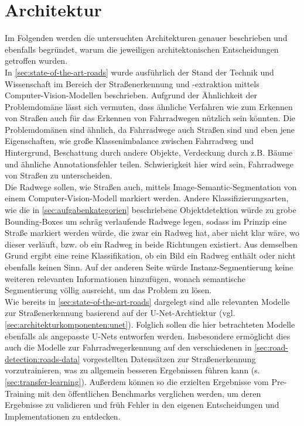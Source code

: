 \section{Architektur} \label{sec:architecture}

Im Folgenden werden die untersuchten Architekturen genauer beschrieben und ebenfalls begründet, 
warum die jeweiligen architektonischen Entscheidungen getroffen wurden. \\
In \autoref{sec:state-of-the-art-roads} wurde ausführlich der Stand der Technik und Wissenschaft 
im Bereich der Straßenerkennung und -extraktion mittels Computer-Vision-Modellen beschrieben. 
Aufgrund der Ähnlichkeit der Problemdomäne lässt sich vermuten, dass ähnliche Verfahren wie 
zum Erkennen von Straßen auch für das Erkennen von Fahrradwegen nützlich sein könnten. 
Die Problemdomänen sind ähnlich, da Fahrradwege auch Straßen sind und eben jene Eigenschaften, 
wie große Klassenimbalance zwischen Fahrradweg und Hintergrund, Beschattung durch andere Objekte,
Verdeckung durch z.B. Bäume und ähnliche Annotationsfehler   
teilen. Schwierigkeit hier wird sein, Fahrradwege von Straßen zu unterscheiden. \\
Die Radwege sollen, wie Straßen auch, mittels Image-Semantic-Segmentation von einem Computer-Vision-Modell 
markiert werden. Andere Klassifizierungsarten, wie die in \autoref{sec:aufgabenkategorien} beschriebene 
Objektdetektion würde zu grobe Bounding-Boxes um schräg verlaufende Radwege legen, sodass im Prinzip 
eine Straße markiert werden würde, die zwar ein Radweg hat, aber nicht klar wäre, wo dieser verläuft, 
bzw. ob ein Radweg in beide Richtungen existiert. Aus demselben Grund ergibt eine reine Klassifikation, 
ob ein Bild ein Radweg enthält oder nicht ebenfalls keinen Sinn. 
Auf der anderen Seite würde Instanz-Segmentierung keine weiteren relevanten Informationen hinzufügen, 
wonach semantische Segmentierung völlig ausreicht, um das Problem zu lösen. \\
Wie bereits in \autoref{sec:state-of-the-art-roads} dargelegt sind alle relevanten Modelle zur 
Straßenerkennung basierend auf der U-Net-Archtiektur (vgl. \ref{sec:architekturkomponenten:unet}).
Folglich sollen die hier betrachteten Modelle ebenfalls als angepasste U-Nets entworfen werden. 
Insbesondere ermöglicht dies auch die Modelle zur Fahrradwegerkennung auf den verschiedenen 
in \autoref{sec:road-detection:roads-data} vorgestellten Datensätzen zur Straßenerkennung vorzutrainieren, 
was zu allgemein besseren Ergebnissen führen kann (s. \autoref{sec:transfer-learning}). 
Außerdem können so die erzielten Ergebnisse vom Pre-Training mit den öffentlichen Benchmarks verglichen werden,
um deren Ergebnisse zu validieren und früh Fehler in den eigenen Entscheidungen und Implementationen zu entdecken.

